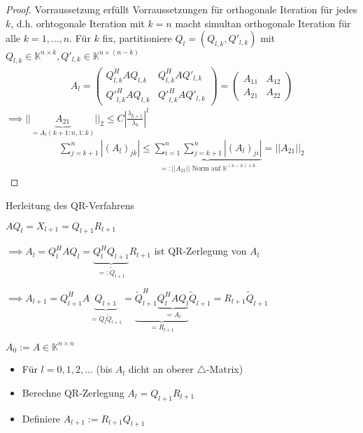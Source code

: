 \begin{proof}
	Vorraussetzung erfüllt Vorraussetzungen für orthogonale Iteration für jedes $k$, d.h. orhtogonale Iteration mit $k=n$ macht simultan orthogonale Iteration für alle $k=1, ..., n$. Für $k$ fix, partitioniere $Q_l = (Q_{l,k}, Q'_{l,k})$ mit $Q_{l,k} \in \mathbb{K}^{n\times k}, Q'_{l,k} \in \mathbb{K}^{n\times (n-k)}$
	\begin{align*}
		A_l = \left(\begin{matrix}
			Q_{l,k}^HAQ_{l,k} & Q_{l,k}^HAQ'_{l,k}\\
			{Q'}_{l,k}^HAQ_{l,k} & {Q'}_{l,k}^HAQ'_{l,k}
		\end{matrix}\right) = \left(\begin{matrix}
			A_{11} & A_{12}\\
			A_{21} & A_{22}
		\end{matrix}\right)
	\end{align*}
	$\implies ||\underbrace{A_{21}}_{=A_l(k+1:n, 1:k)}||_2 \leq C \left|\frac{\lambda_{k+1}}{\lambda_k}\right|^l$
	\begin{align*}
		\sum_{j=k+1}^{n} |(A_l)_{jk}| \leq \underbrace{\sum_{i=1}^{n} \sum_{j=k+1}^{n} |(A_l)_{ji}| }_{=:||A_{21}|| \text{ Norm auf } \mathbb{K}^{(n-k)\times k}} = ||A_{21}||_2
	\end{align*}
\end{proof}

Herleitung des QR-Verfahrens

$AQ_l = X_{l+1} = Q_{l+1}R_{l+1}$

$\implies A_l = Q_l^HAQ_l = \underbrace{Q_l^HQ_{l+1}}_{=:\tilde{Q}_{l+1}}R_{l+1}$ ist QR-Zerlegung von $A_l$

$\implies A_{l+1} = Q_{l+1}^HA\underbrace{Q_{l+1}}_{=Q_l\tilde{Q}_{l+1}} = \underbrace{\tilde{Q}_{l+1}^H \underbrace{Q_l^HAQ_l}_{=A_l}}_{=R_{l+1}}\tilde{Q}_{l+1} = R_{l+1}\tilde{Q}_{l+1}$

\begin{algorithm}[QR-Verfahren]
	$A_0 := A \in \mathbb{K}^{n\times n}$
	\begin{itemize}
		\item Für $l=0, 1,2, ...$ (bis $A_l$ dicht an oberer $\triangle$-Matrix)
		\item \hspace{0.5cm} Berechne QR-Zerlegung $A_l = Q_{l+1}R_{l+1}$
		\item \hspace{0.5cm} Definiere $A_{l+1} := R_{l+1}Q_{l+1}$
	\end{itemize}
\end{algorithm}

